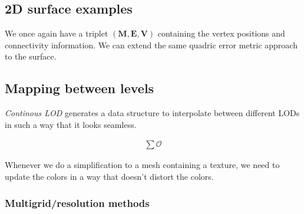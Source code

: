 \subsection{2D surface examples}

We once again have a triplet $(\mathbf{M,E,V})$
containing the vertex positions and connectivity
information. We can extend the same quadric
error metric approach to the surface.


\subsection{Mapping between levels}

\emph{Continous LOD} generates a data structure 
to interpolate between different LODs in such a way
that it looks seamless. 

\begin{align}
    \sum \mathcal{O}
\end{align}

Whenever we do a simplification to a mesh
containing a texture, we need to update the
colors in a way that doesn't distort the colors.

\subsubsection{Multigrid/resolution methods}


